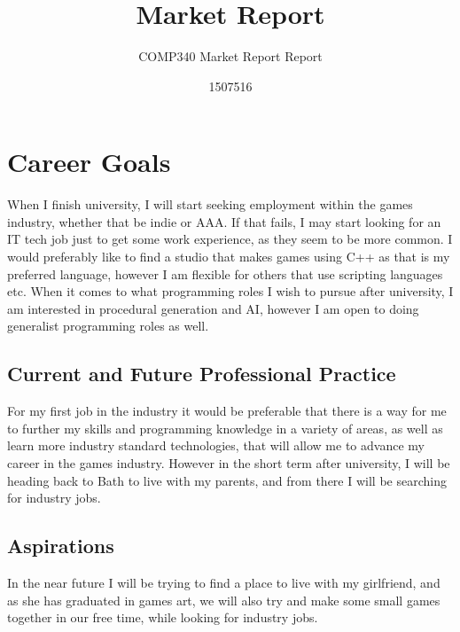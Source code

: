 \documentclass{scrartcl}
\title{Market Report}
\subtitle{COMP340 Market Report Report}
\author{1507516}
\begin{document}
\maketitle


\section{Career Goals}


When I finish university, I will start seeking employment within the games industry, whether that be indie or AAA. If that fails, I may start looking for an IT tech job just to get some work experience, as they seem to be more common.
I would preferably like to find a studio that makes games using C++ as that is my preferred language, however I am flexible for others that use scripting languages etc.
When it comes to what programming roles I wish to pursue after university, I am interested in procedural generation and AI, however I am open to doing generalist programming roles as well.


\subsection{Current and Future Professional Practice}
For my first job in the industry it would be preferable that there is a way for me to further my skills and programming knowledge in a variety of areas, as well as learn more industry standard technologies, that will allow me to advance my career in the games industry. 
However in the short term after university, I will be heading back to Bath to live with my parents, and from there I will be searching for industry jobs.





\subsection{Aspirations} 

In the near future I will be trying to find a place to live with my girlfriend, and as she has graduated in games art, we will also try and make some small games together in our free time, while looking for industry jobs.
\end{document}
